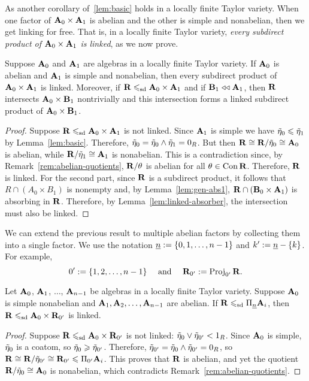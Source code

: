   As another corollary of~\ref{lem:basic}
  holds in a locally finite Taylor variety.
  When one factor of $\mathbf{A}_0 \times \mathbf{A}_1$ is
  abelian and the other is simple and nonabelian, then we get linking for
  free. That is, in a locally finite Taylor variety,
  \emph{every subdirect product of $\mathbf{A}_0 \times \mathbf{A}_1$ is linked}, as we now prove. 
  \begin{corollary}
    \label{cor:S-NA-AF_A-pre}
    Suppose $\mathbf{A}_0$ and $\mathbf{A}_1$ are algebras in a locally finite Taylor variety.
    If $\mathbf{A}_0$ is abelian and $\mathbf{A}_1$ is simple and nonabelian, then
    every subdirect product of $\mathbf{A}_0 \times \mathbf{A}_1$ is linked.     Moreover, if 
    $\mathbf{R} \leqslant_{\mathrm{sd}} \mathbf{A}_0 \times \mathbf{A}_1$ and if $\mathbf{B}_1 \mathrel{\triangleleft\triangleleft} \mathbf{A}_1$,
    then  $\mathbf{R}$ intersects $\mathbf{A}_0\times \mathbf{B}_1$ nontrivially and this intersection
    forms a linked subdirect product of $\mathbf{A}_0 \times \mathbf{B}_1$.
  \end{corollary}
  \begin{proof}
    Suppose  $\mathbf{R} \leqslant_{\mathrm{sd}} \mathbf{A}_0 \times \mathbf{A}_1$ is not linked. Since $\mathbf{A}_1$ is simple
    we have $\tilde{\eta}_0 \leqslant \tilde{\eta}_1$ by Lemma~\ref{lem:basic}.
    Therefore, $\tilde{\eta}_0 = \tilde{\eta}_0 \wedge \tilde{\eta}_1 = 0_R$.  But
    then $\mathbf{R} \cong \mathbf{R}/\tilde{\eta}_0 \cong \mathbf{A}_0$ is abelian, while
    $\mathbf{R}/\tilde{\eta}_1 \cong \mathbf{A}_1$ is nonabelian. This is a contradiction
    since, by Remark~\ref{rem:abelian-quotients},
    $\mathbf{R}/\theta$ is abelian for all
    $\theta \in \operatorname{Con} \mathbf{R}$.  Therefore, $\mathbf{R}$ is linked.
    For the second part, since $\mathbf{R}$ is a subdirect product, it follows that
    $R \cap (A_0\times B_1)$ is nonempty and, by
    Lemma~\ref{lem:gen-abs1},  $\mathbf{R} \cap (\mathbf{B}_0\times \mathbf{A}_1)$ is
    absorbing in $\mathbf{R}$. Therefore, by Lemma~\ref{lem:linked-absorber},
    the intersection must also be linked. 
  \end{proof}
  We can extend the previous result to multiple abelian factors by collecting
  them into a single factor.
  We use the notation $\underline{n} := \{0,1,\dots, n-1\}$ and $k':=\underline{n}-\{k\}$.
  For example,
  \[0' :=  \{1,2 ,\dots, n-1\} \quad \text{ and }\quad \mathbf{R}_{0'} := \operatorname{Proj}_{0'} \mathbf{R}.\]  
  \begin{corollary}
    \label{cor:Link-1}
    Let $\mathbf{A}_0$, $\mathbf{A}_1$, $\dots$, $\mathbf{A}_{n-1}$ be algebras in a locally finite Taylor variety.
    Suppose $\mathbf{A}_0$ is simple nonabelian and $\mathbf{A}_1, \mathbf{A}_2, \dots, \mathbf{A}_{n-1}$ are abelian.
    If $\mathbf{R} \leqslant_{\mathrm{sd}} \Pi_{\underline{n}} \mathbf{A}_i$, then $\mathbf{R} \leqslant_{\mathrm{sd}} \mathbf{A}_0 \times \mathbf{R}_{0'}$ is linked.
  \end{corollary}
  \begin{proof}
    Suppose $\mathbf{R} \leqslant_{\mathrm{sd}} \mathbf{A}_0 \times \mathbf{R}_{0'}$ is not linked: $\tilde{\eta}_0 \vee \tilde{\eta}_{0'} < 1_R$.
    Since $\mathbf{A}_0$ is simple, $\tilde{\eta}_0$ is a coatom, so
    $\tilde{\eta}_0 \geqslant \tilde{\eta}_{0'}$. Therefore, $ \tilde{\eta}_{0'} = \tilde{\eta}_0 \wedge \tilde{\eta}_{0'} = 0_R$,
    so $\mathbf{R} \cong \mathbf{R}/\tilde{\eta}_{0'} \cong \mathbf{R}_{0'} \leqslant \Pi_{0'}\mathbf{A}_i$.
    This proves that $\mathbf{R}$ is abelian, and yet %
    the quotient $\mathbf{R}/\tilde{\eta}_0 \cong \mathbf{A}_0$ is nonabelian,
    which contradicts Remark~\ref{rem:abelian-quotients}.
  \end{proof}


